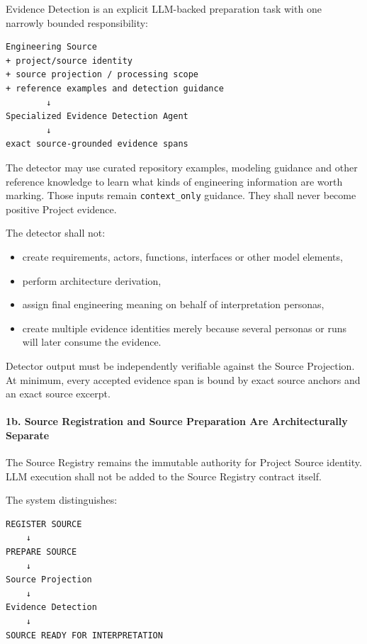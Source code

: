 Evidence Detection is an explicit LLM-backed preparation task with one narrowly bounded responsibility:

\begin{verbatim}
Engineering Source
+ project/source identity
+ source projection / processing scope
+ reference examples and detection guidance
        ↓
Specialized Evidence Detection Agent
        ↓
exact source-grounded evidence spans
\end{verbatim}

The detector may use curated repository examples, modeling guidance and other reference knowledge to learn what kinds of engineering information are worth marking. Those inputs remain \texttt{context\_only} guidance. They shall never become positive Project evidence.

The detector shall not:

\begin{itemize}
\tightlist
\item
  create requirements, actors, functions, interfaces or other model elements,
\item
  perform architecture derivation,
\item
  assign final engineering meaning on behalf of interpretation personas,
\item
  create multiple evidence identities merely because several personas or runs will later consume the evidence.
\end{itemize}

Detector output must be independently verifiable against the Source Projection. At minimum, every accepted evidence span is bound by exact source anchors and an exact source excerpt.

\hypertarget{1b-source-registration-and-source-preparation-are-architecturally-separate}{%
\paragraph{1b. Source Registration and Source Preparation Are Architecturally Separate}\label{1b-source-registration-and-source-preparation-are-architecturally-separate}}

The Source Registry remains the immutable authority for Project Source identity. LLM execution shall not be added to the Source Registry contract itself.

The system distinguishes:

\begin{verbatim}
REGISTER SOURCE
    ↓
PREPARE SOURCE
    ↓
Source Projection
    ↓
Evidence Detection
    ↓
SOURCE READY FOR INTERPRETATION
\end{verbatim}

